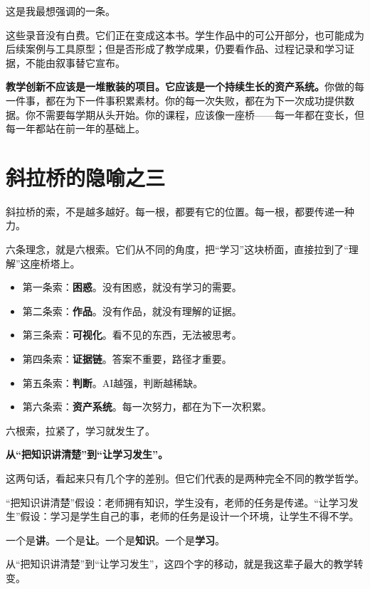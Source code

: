 这是我最想强调的一条。

这些录音没有白费。它们正在变成这本书。学生作品中的可公开部分，也可能成为后续案例与工具原型；但是否形成了教学成果，仍要看作品、过程记录和学习证据，不能由叙事替它宣布。

\textbf{教学创新不应该是一堆散装的项目。它应该是一个持续生长的资产系统。}你做的每一件事，都在为下一件事积累素材。你的每一次失败，都在为下一次成功提供数据。你不需要每学期从头开始。你的课程，应该像一座桥——每一年都在变长，但每一年都站在前一年的基础上。

\section{斜拉桥的隐喻之三}

斜拉桥的索，不是越多越好。每一根，都要有它的位置。每一根，都要传递一种力。

六条理念，就是六根索。它们从不同的角度，把``学习''这块桥面，直接拉到了``理解''这座桥塔上。

\begin{itemize}
  \item 第一条索：\textbf{困惑}。没有困惑，就没有学习的需要。
  \item 第二条索：\textbf{作品}。没有作品，就没有理解的证据。
  \item 第三条索：\textbf{可视化}。看不见的东西，无法被思考。
  \item 第四条索：\textbf{证据链}。答案不重要，路径才重要。
  \item 第五条索：\textbf{判断}。AI越强，判断越稀缺。
  \item 第六条索：\textbf{资产系统}。每一次努力，都在为下一次积累。
\end{itemize}

六根索，拉紧了，学习就发生了。

\begin{shiyu-note}
\label{note:chap9}

\textbf{从``把知识讲清楚''到``让学习发生''。}

这两句话，看起来只有几个字的差别。但它们代表的是两种完全不同的教学哲学。

``把知识讲清楚''假设：老师拥有知识，学生没有，老师的任务是传递。``让学习发生''假设：学习是学生自己的事，老师的任务是设计一个环境，让学生不得不学。

一个是\textbf{讲}。一个是\textbf{让}。一个是\textbf{知识}。一个是\textbf{学习}。

从``把知识讲清楚''到``让学习发生''，这四个字的移动，就是我这辈子最大的教学转变。
\end{shiyu-note}

